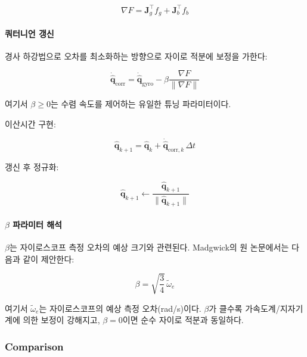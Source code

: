 \begin{equation}
    \nabla F = \mathbf{J}_g^\top f_g + \mathbf{J}_b^\top f_b
    \label{eq:madgwick_total_gradient}
\end{equation}

\paragraph{쿼터니언 갱신}

경사 하강법으로 오차를 최소화하는 방향으로 자이로 적분에 보정을 가한다:

\begin{equation}
    \dot{\hat{\mathbf{q}}}_{\text{corr}} = \dot{\hat{\mathbf{q}}}_{\text{gyro}} - \beta\frac{\nabla F}{\|\nabla F\|}
    \label{eq:madgwick_update}
\end{equation}

\noindent 여기서 $\beta \geq 0$는 수렴 속도를 제어하는 유일한 튜닝 파라미터이다.

이산시간 구현:

\begin{equation}
    \hat{\mathbf{q}}_{k+1} = \hat{\mathbf{q}}_k + \dot{\hat{\mathbf{q}}}_{\text{corr},k}\,\Delta t
    \label{eq:madgwick_discrete}
\end{equation}

갱신 후 정규화:

\begin{equation}
    \hat{\mathbf{q}}_{k+1} \leftarrow \frac{\hat{\mathbf{q}}_{k+1}}{\|\hat{\mathbf{q}}_{k+1}\|}
    \label{eq:madgwick_normalize}
\end{equation}

\paragraph{$\beta$ 파라미터 해석}

$\beta$는 자이로스코프 측정 오차의 예상 크기와 관련된다.
Madgwick의 원 논문에서는 다음과 같이 제안한다:

\begin{equation}
    \beta = \sqrt{\frac{3}{4}}\,\tilde{\omega}_e
    \label{eq:madgwick_beta}
\end{equation}

\noindent 여기서 $\tilde{\omega}_e$는 자이로스코프의 예상 측정 오차(rad/s)이다.
$\beta$가 클수록 가속도계/지자기계에 의한 보정이 강해지고,
$\beta = 0$이면 순수 자이로 적분과 동일하다.

\subsubsection{Comparison}

